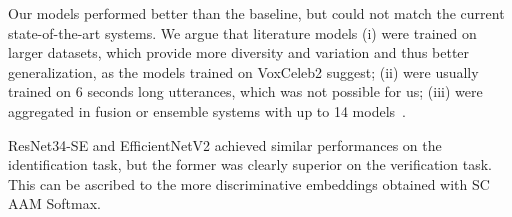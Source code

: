 \documentclass[conference]{IEEEtran}
\begin{document}
Our models performed better than the baseline, but could not match the current state-of-the-art systems. We argue that literature models (i) were trained on larger datasets, which provide more diversity and variation and thus better generalization, as the models trained on VoxCeleb2 suggest; (ii) were usually trained on 6 seconds long utterances, which was not possible for us; (iii) were aggregated in fusion or ensemble systems with up to 14 models~\cite{zhang2021beijing}.

ResNet34-SE and EfficientNetV2 achieved similar performances on the identification task, but the former was clearly superior on the verification task. This can be ascribed to the more discriminative embeddings obtained with SC AAM Softmax. 

\end{document}
